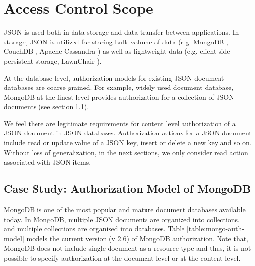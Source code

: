 \section { Access Control Scope}
\label {sec:scope}
JSON  is  used   both in data storage and  data  transfer between applications. In storage, JSON is utilized  for storing bulk volume of data (e.g. MongoDB \cite{mongodb}, CouchDB \cite{couchdb}, Apache Cassandra \cite{cassandra}) as well as  lightweight data (e.g. client side persistent storage, LawnChair \cite{lawnchair}).  

At the database level, authorization models for existing JSON document databases are coarse grained. For example, widely used document database, MongoDB at the finest level provides authorization for a collection of JSON documents (see section \ref{sec:mongodb-authorization}). 

We feel  there are legitimate requirements for content level authorization of a JSON document in JSON databases. Authorization actions for a JSON document include read or update value of a JSON key, insert or delete a new key and so on. Without loss of generalization, in the next sections, we only consider read action associated with JSON items.



\subsection{Case Study: Authorization Model of MongoDB}
\label{sec:mongodb-authorization}

MongoDB is one of the most popular and mature document databases available today. In MongoDB, multiple JSON documents are organized into collections, and multiple collections are organized into databases. Table \ref{table:mongo-auth-model} models the current version (v 2.6) of MongoDB authorization. Note that, MongoDB does not  include single document as a resource type and thus, it is not possible to specify authorization at the document level or at the content level.



